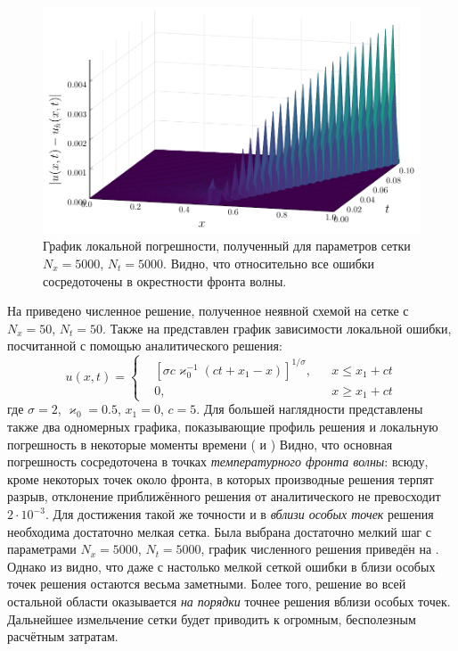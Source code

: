 \begin{figure}
    \centering
    \includegraphics{Разностные_схемы_на_статических_сетках/Программный_код_примеры_расчётов/explicit_scheme/problem_2_implicit_error_surface_high.pdf}
    \caption{График локальной погрешности, полученный для параметров сетки $N_x = 5000$, $N_t = 5000$. Видно, что относительно все ошибки сосредоточены в окрестности фронта волны.}
    \label{fig:problem_2_implicit_error_surface_high}
\end{figure}
На  приведено численное решение, полученное неявной схемой на сетке с $N_x = 50$, $N_t = 50$.
Также на  представлен график зависимости локальной ошибки, посчитанной с помощью аналитического решения:
\begin{equation}\label{eq:problem_2}
    u(x, t) = \left\{
        \begin{aligned}
            &\left[ \sigma c\varkappa_0^{-1} (ct + x_1 - x) \right]^{1/\sigma}, && x \le x_1 + ct\\
            &0, && x \ge x_1 + ct
        \end{aligned}
    \right.
\end{equation}
где $\sigma = 2$, $\varkappa_0 = 0.5$, $x_1 = 0$, $c = 5$. 
Для большей наглядности представлены также два одномерных графика, показывающие профиль решения и локальную погрешность в некоторые моменты времени ( и )
Видно, что основная погрешность сосредоточена в точках \emph{температурного фронта волны}: всюду, кроме некоторых точек около фронта, в которых производные решения терпят разрыв, отклонение приближённого решения от аналитического не превосходит $2\cdot 10^{-3}$.
Для достижения такой же точности и в \emph{вблизи особых точек} решения необходима достаточно мелкая сетка.
Была выбрана достаточно мелкий шаг с параметрами $N_x = 5000$, $N_t = 5000$, график численного решения приведён на .
Однако из  видно, что даже с настолько мелкой сеткой ошибки в близи особых точек решения остаются весьма заметными.
Более того, решение во всей остальной области оказывается \emph{на порядки} точнее решения вблизи особых точек.
Дальнейшее измельчение сетки будет приводить к огромным, бесполезным расчётным затратам.

